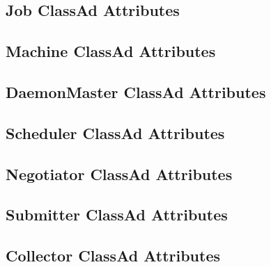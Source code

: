 \subsection*{\label{sec:Job-ClassAd-Attributes}Job ClassAd Attributes}


\subsection*{\label{sec:Machine-ClassAd-Attributes}Machine ClassAd Attributes}


\subsection*{\label{sec:DaemonMaster-ClassAd-Attributes}DaemonMaster ClassAd Attributes}


\subsection*{\label{sec:Scheduler-ClassAd-Attributes}Scheduler ClassAd Attributes}


\subsection*{\label{sec:Negotiator-ClassAd-Attributes}Negotiator ClassAd Attributes}


\subsection*{\label{sec:Submitter-ClassAd-Attributes}Submitter ClassAd Attributes}


\subsection*{\label{sec:Collector-ClassAd-Attributes}Collector ClassAd Attributes}


